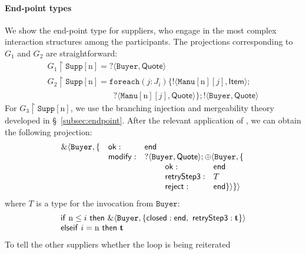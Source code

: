 \documentclass{LMCS}
\newcommand{\kf}[1]{\textup{\textsf{#1}}\xspace}
\newcommand{\ty}{\textbf{t}}
\newcommand{\End}{\kf{end}}
\newcommand{\trule}[1]{\text{\footnotesize{\ensuremath{\lfloor\text{\sc{#1}}\rfloor}}}}
\newcommand{\Loutt}[2]{\ensuremath{!\langle #1,#2\rangle}}
\newcommand{\Lin}[3]{\ensuremath{?\langle #1,#2\rangle;#3}}
\newcommand{\Linn}[2]{\ensuremath{?\langle #1,#2\rangle}}
\newcommand{\IF}{\kf{if}}
\newcommand{\THEN}{\kf{then}}
\newcommand{\ELSE}{\kf{else}}
\newcommand{\jj}{\ensuremath{j}}
\newcommand{\n}{\ensuremath{\mathrm{n}}}
\newcommand{\proj}[1]{\ensuremath{\upharpoonright #1}}
\begin{document}
\paragraph{End-point types}
We show the end-point type for suppliers, who engage in
the most complex interaction structures among the participants.  
The projections corresponding to 
$G_1$ and $G_2$ are 
straightforward:
\[
\begin{array}{lllll}
G_1\proj{\texttt{Supp}[\n]} = \Linn{\texttt{Buyer}}{\mathsf{Quote}} \\[1mm]
G_2\proj{\texttt{Supp}[\n]} = \mathtt{foreach}({\jj}:{J_i})\{ \Loutt{\texttt{Manu}[\n][\jj]}{\mathsf{Item}}; \\
\qquad\qquad\qquad\qquad {\Linn{\texttt{Manu}[\n][\jj]}{\mathsf{Quote}}\}; {\Loutt{\texttt{Buyer}}{\mathsf{Quote}}}}
\end{array}
\]
For $G_3\proj{\texttt{Supp}[\n]}$, 
we use the branching injection and 
mergeability theory developed in 
\S~\ref{subsec:endpoint}. 
After the relevant application of \trule{TEq}, we can obtain 
the following projection:
\[
\begin{array}{l}
\begin{array}{l}
\&\langle\texttt{Buyer}, \{ \\
\\
\\
\\
\\
\end{array}
\begin{array}{ll}
\mathsf{ok}: & \End\\
\mathsf{modify}: & \Lin{\texttt{Buyer}}{\mathsf{Quote}}{} \oplus\langle\texttt{Buyer}, \{ \\
& \begin{array}{ll}
\qquad \mathsf{ok}: & \End \\
\qquad \mathsf{retryStep3}: & T\\
\qquad \mathsf{reject}: & \End\}\rangle\}\rangle\\
\end{array}
\end{array}
\end{array}
\]
where $T$ is a type for the invocation 
from $\texttt{Buyer}$: 
\[
\begin{array}{l}
\IF \ \n\leq i \ \THEN \ \&\langle \texttt{Buyer}, \{ \mathsf{closed}:\End, 
\ \mathsf{retryStep3}:\ty \} \rangle \\ 
\ELSE\IF \ i=\n \ \THEN \ \ty
\end{array}
\]
To tell the other suppliers whether the loop is being reiterated 
\end{document}
